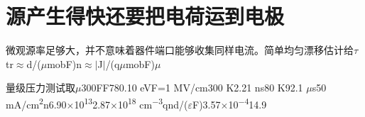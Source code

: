 \section{{\cjkfont 源产生得快还要把电荷运到电极}\allowbreak{}}\label{sec:49}
{\cjkfont 微观源率足够大，并不意味着器件端口能够收集同样电流。简单均匀漂移估计给}\allowbreak{}\ensuremath{\tau}tr\ensuremath{\approx}\allowbreak{}d/(\ensuremath{\mu}mobF)\allowbreak{}n\ensuremath{\approx}\allowbreak{}\ensuremath{\vert}J\ensuremath{\vert}/(q\ensuremath{\mu}mobF)\allowbreak{}\ensuremath{\mu}\allowbreak{}
\par
{\cjkfont 量级压力测试取}\allowbreak{}\ensuremath{\mu}300\allowbreak{}FF78\allowbreak{}0.10 eV\allowbreak{}F=\allowbreak{}1 MV/cm\allowbreak{}300 K\allowbreak{}2.21 ns\allowbreak{}80 K\allowbreak{}92.1 \ensuremath{\mu}s\allowbreak{}50 mA/cm\textsuperscript{2}\allowbreak{}n\allowbreak{}6.90\ensuremath{\times}10\textsuperscript{13}\allowbreak{}2.87\ensuremath{\times}10\textsuperscript{18} cm\textsuperscript{−3}\allowbreak{}qnd/(\ensuremath{\varepsilon}F)\allowbreak{}3.57\ensuremath{\times}10\textsuperscript{−4}\allowbreak{}14.9\allowbreak{}
\par
